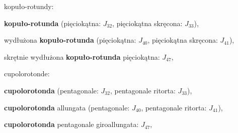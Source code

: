 \begin{compactitem}
\begin{compactitem}
\begin{compactitem}
    \item kopuło-rotundy: \begin{compactitem} %
        \item \textbf{kopuło-rotunda} (pięciokątna: $J_{32}$, pięciokątna skręcona: $J_{33}$), %
        \item wydłużona \textbf{kopuło-rotunda} (pięciokątna: $J_{40}$, pięciokątna skręcona: $J_{41}$), %
        \item skrętnie wydłużona \textbf{kopuło-rotunda} pięciokątna: $J_{47}$, %
    \item cupolorotonde: \begin{compactitem} %
        \item \textbf{cupolorotonda} (pentagonale: $J_{32}$, pentagonale ritorta: $J_{33}$), %
        \item \textbf{cupolorotonda} allungata (pentagonale: $J_{40}$, pentagonale ritorta: $J_{41}$), %
        \item \textbf{cupolorotonda} pentagonale giroallungata: $J_{47}$, %
    \end{compactitem}


\end{compactitem}
\end{compactitem}
\end{compactitem}
\end{compactitem}
